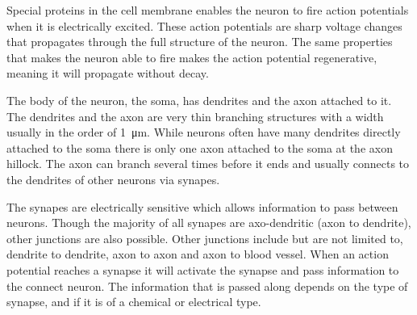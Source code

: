 \documentclass[altfont, fleqn]{uiophd}
\begin{document}
Special proteins in the cell membrane enables the neuron to
fire action potentials when it is electrically excited. 
These action potentials are sharp voltage changes that propagates through
the full structure of the neuron.
The same properties that makes the neuron able to fire makes 
the action potential {regenerative}, meaning it will propagate
without decay.

The body of the neuron, the {soma}, has {dendrites} and 
the {axon} attached to it. 
The dendrites and the axon are very thin branching structures 
with a width usually in the order of \SI{1}{\micro\metre}. 
While neurons often have many dendrites directly attached to the soma
there is only one axon attached to the soma at the axon hillock.
The axon can branch several times before it ends and 
usually connects to the dendrites of other neurons via synapes.

The synapes are electrically sensitive which allows information
to pass between neurons. 
Though the majority of all synapes are axo-dendritic 
(axon to dendrite),
other junctions are also possible.
Other junctions include but are not limited to,
dendrite to dendrite, 
axon to axon and 
axon to blood vessel. 
When an action potential reaches a synapse it will activate
the synapse and pass information to the connect neuron. 
The information that is passed along depends on the type of synapse,
and if it is of a chemical or electrical type.


\end{document}
